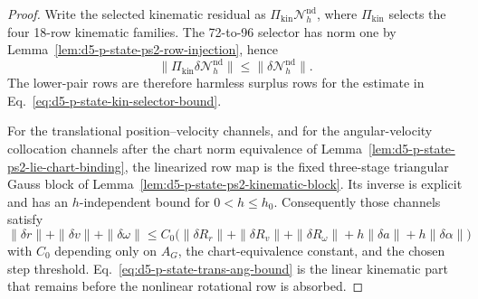 \documentclass[preprint,12pt]{elsarticle}
\begin{document}
\begin{proof}
Write the selected kinematic residual as
\(\Pi_{\mathrm{kin}}\mathcal N_h^{\mathrm{nd}}\), where
\(\Pi_{\mathrm{kin}}\) selects the four 18-row kinematic families.  The
72-to-96 selector has norm one by
Lemma~\ref{lem:d5-p-state-ps2-row-injection}, hence
\begin{equation}
\label{eq:d5-p-state-kin-selector-bound}
  \|\Pi_{\mathrm{kin}}\delta\mathcal N_h^{\mathrm{nd}}\|
  \le \|\delta\mathcal N_h^{\mathrm{nd}}\|.
\end{equation}
The lower-pair rows are therefore harmless surplus rows for the estimate in
Eq.~\eqref{eq:d5-p-state-kin-selector-bound}.

For the translational position--velocity channels, and for the
angular-velocity collocation channels after the chart norm equivalence of
Lemma~\ref{lem:d5-p-state-ps2-lie-chart-binding}, the linearized row map is
the fixed three-stage triangular Gauss block of
Lemma~\ref{lem:d5-p-state-ps2-kinematic-block}.  Its inverse is explicit and
has an \(h\)-independent bound for \(0<h\le h_0\).  Consequently those
channels satisfy
\begin{equation}
\label{eq:d5-p-state-trans-ang-bound}
  \|\delta r\|+\|\delta v\|+\|\delta\omega\|
  \le C_0\bigl(\|\delta R_r\|+\|\delta R_v\|
      +\|\delta R_\omega\|+h\|\delta a\|+h\|\delta\alpha\|\bigr)
\end{equation}
with \(C_0\) depending only on \(A_G\), the chart-equivalence constant, and
the chosen step threshold.  Eq.~\eqref{eq:d5-p-state-trans-ang-bound} is the
linear kinematic part that remains before the nonlinear rotational row is
absorbed.


\end{proof}
\end{document}
